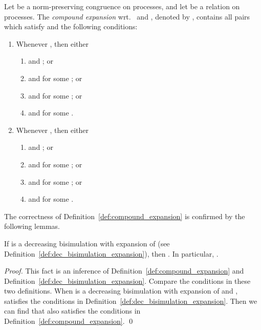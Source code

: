 \documentclass{llncs}
\begin{document}
\begin{definition}\label{def:compound_expansion}
Let  be a norm-preserving congruence on processes, and
let  be a relation on processes. The {\em compound expansion} wrt.~ and , denoted by , contains all pairs
 which satisfy  and  the following conditions:
\begin{enumerate}
\item
Whenever , then either
 \begin{enumerate}
 \item
   and ; or

  \item
   and   for some ; or

 \item
   and   for some ; or

  \item
   and   for some .
\end{enumerate}

\item
Whenever  , then either
 \begin{enumerate}
 \item
     and ; or

 \item
   and   for some ; or

 \item
   and   for some ; or

  \item
   and   for some .
   \end{enumerate}
\end{enumerate}
\end{definition}
The correctness of Definition~\ref{def:compound_expansion} is confirmed by the following lemmas.
\begin{lemma}\label{lem:decreasing_branching_bisimulation_oneside_contain}
If  is a decreasing bisimulation with expansion of  (see Definition~\ref{def:dec_bisimulation_expansion}),
then . In particular,
 .
\end{lemma}

\begin{proof}
This fact is an inference of  Definition~\ref{def:compound_expansion} and Definition~\ref{def:dec_bisimulation_expansion}.  Compare the conditions in these two definitions. When  is a decreasing bisimulation with expansion of   and ,  satisfies the conditions in Definition~\ref{def:dec_bisimulation_expansion}. Then we can find that  also satisfies the conditions in Definition~\ref{def:compound_expansion}. \qed
\end{proof}
\end{document}
